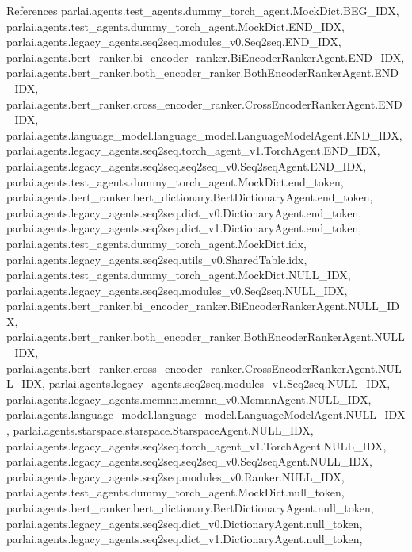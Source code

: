 References parlai.\+agents.\+test\+\_\+agents.\+dummy\+\_\+torch\+\_\+agent.\+Mock\+Dict.\+B\+E\+G\+\_\+\+I\+DX, parlai.\+agents.\+test\+\_\+agents.\+dummy\+\_\+torch\+\_\+agent.\+Mock\+Dict.\+E\+N\+D\+\_\+\+I\+DX, parlai.\+agents.\+legacy\+\_\+agents.\+seq2seq.\+modules\+\_\+v0.\+Seq2seq.\+E\+N\+D\+\_\+\+I\+DX, parlai.\+agents.\+bert\+\_\+ranker.\+bi\+\_\+encoder\+\_\+ranker.\+Bi\+Encoder\+Ranker\+Agent.\+E\+N\+D\+\_\+\+I\+DX, parlai.\+agents.\+bert\+\_\+ranker.\+both\+\_\+encoder\+\_\+ranker.\+Both\+Encoder\+Ranker\+Agent.\+E\+N\+D\+\_\+\+I\+DX, parlai.\+agents.\+bert\+\_\+ranker.\+cross\+\_\+encoder\+\_\+ranker.\+Cross\+Encoder\+Ranker\+Agent.\+E\+N\+D\+\_\+\+I\+DX, parlai.\+agents.\+language\+\_\+model.\+language\+\_\+model.\+Language\+Model\+Agent.\+E\+N\+D\+\_\+\+I\+DX, parlai.\+agents.\+legacy\+\_\+agents.\+seq2seq.\+torch\+\_\+agent\+\_\+v1.\+Torch\+Agent.\+E\+N\+D\+\_\+\+I\+DX, parlai.\+agents.\+legacy\+\_\+agents.\+seq2seq.\+seq2seq\+\_\+v0.\+Seq2seq\+Agent.\+E\+N\+D\+\_\+\+I\+DX, parlai.\+agents.\+test\+\_\+agents.\+dummy\+\_\+torch\+\_\+agent.\+Mock\+Dict.\+end\+\_\+token, parlai.\+agents.\+bert\+\_\+ranker.\+bert\+\_\+dictionary.\+Bert\+Dictionary\+Agent.\+end\+\_\+token, parlai.\+agents.\+legacy\+\_\+agents.\+seq2seq.\+dict\+\_\+v0.\+Dictionary\+Agent.\+end\+\_\+token, parlai.\+agents.\+legacy\+\_\+agents.\+seq2seq.\+dict\+\_\+v1.\+Dictionary\+Agent.\+end\+\_\+token, parlai.\+agents.\+test\+\_\+agents.\+dummy\+\_\+torch\+\_\+agent.\+Mock\+Dict.\+idx, parlai.\+agents.\+legacy\+\_\+agents.\+seq2seq.\+utils\+\_\+v0.\+Shared\+Table.\+idx, parlai.\+agents.\+test\+\_\+agents.\+dummy\+\_\+torch\+\_\+agent.\+Mock\+Dict.\+N\+U\+L\+L\+\_\+\+I\+DX, parlai.\+agents.\+legacy\+\_\+agents.\+seq2seq.\+modules\+\_\+v0.\+Seq2seq.\+N\+U\+L\+L\+\_\+\+I\+DX, parlai.\+agents.\+bert\+\_\+ranker.\+bi\+\_\+encoder\+\_\+ranker.\+Bi\+Encoder\+Ranker\+Agent.\+N\+U\+L\+L\+\_\+\+I\+DX, parlai.\+agents.\+bert\+\_\+ranker.\+both\+\_\+encoder\+\_\+ranker.\+Both\+Encoder\+Ranker\+Agent.\+N\+U\+L\+L\+\_\+\+I\+DX, parlai.\+agents.\+bert\+\_\+ranker.\+cross\+\_\+encoder\+\_\+ranker.\+Cross\+Encoder\+Ranker\+Agent.\+N\+U\+L\+L\+\_\+\+I\+DX, parlai.\+agents.\+legacy\+\_\+agents.\+seq2seq.\+modules\+\_\+v1.\+Seq2seq.\+N\+U\+L\+L\+\_\+\+I\+DX, parlai.\+agents.\+legacy\+\_\+agents.\+memnn.\+memnn\+\_\+v0.\+Memnn\+Agent.\+N\+U\+L\+L\+\_\+\+I\+DX, parlai.\+agents.\+language\+\_\+model.\+language\+\_\+model.\+Language\+Model\+Agent.\+N\+U\+L\+L\+\_\+\+I\+DX, parlai.\+agents.\+starspace.\+starspace.\+Starspace\+Agent.\+N\+U\+L\+L\+\_\+\+I\+DX, parlai.\+agents.\+legacy\+\_\+agents.\+seq2seq.\+torch\+\_\+agent\+\_\+v1.\+Torch\+Agent.\+N\+U\+L\+L\+\_\+\+I\+DX, parlai.\+agents.\+legacy\+\_\+agents.\+seq2seq.\+seq2seq\+\_\+v0.\+Seq2seq\+Agent.\+N\+U\+L\+L\+\_\+\+I\+DX, parlai.\+agents.\+legacy\+\_\+agents.\+seq2seq.\+modules\+\_\+v0.\+Ranker.\+N\+U\+L\+L\+\_\+\+I\+DX, parlai.\+agents.\+test\+\_\+agents.\+dummy\+\_\+torch\+\_\+agent.\+Mock\+Dict.\+null\+\_\+token, parlai.\+agents.\+bert\+\_\+ranker.\+bert\+\_\+dictionary.\+Bert\+Dictionary\+Agent.\+null\+\_\+token, parlai.\+agents.\+legacy\+\_\+agents.\+seq2seq.\+dict\+\_\+v0.\+Dictionary\+Agent.\+null\+\_\+token, parlai.\+agents.\+legacy\+\_\+agents.\+seq2seq.\+dict\+\_\+v1.\+Dictionary\+Agent.\+null\+\_\+token, 